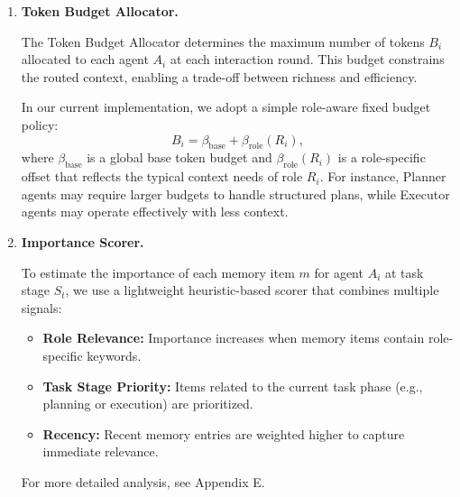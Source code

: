 \documentclass[letterpaper]{article} %
\begin{document}
\begin{enumerate}
    \item \textbf{Token Budget Allocator.}

    The Token Budget Allocator determines the maximum number of tokens $B_i$ allocated to each agent $A_i$ at each interaction round. This budget constrains the routed context, enabling a trade-off between richness and efficiency.

    In our current implementation, we adopt a simple role-aware fixed budget policy:
    \begin{equation}
        B_i = \beta_{\text{base}} + \beta_{\text{role}}(R_i),
    \end{equation}
    where $\beta_{\text{base}}$ is a global base token budget and $\beta_{\text{role}}(R_i)$ is a role-specific offset that reflects the typical context needs of  role $R_i$. For instance, Planner agents may require larger budgets to handle structured plans, while Executor agents may operate effectively with less context.

    \item \textbf{Importance Scorer.}

    To estimate the importance of each memory item $m$ for agent $A_i$ at task stage $S_t$, we use a lightweight heuristic-based scorer that combines multiple signals:
    \begin{itemize}
        \item \textbf{Role Relevance:} Importance increases when memory items contain role-specific keywords.
        \item \textbf{Task Stage Priority:} Items related to the current task phase (e.g., planning or execution) are prioritized.
        \item \textbf{Recency:} Recent memory entries are weighted higher to capture immediate relevance.
    \end{itemize}
For more detailed analysis, see Appendix E.


\end{enumerate}
\end{document}
